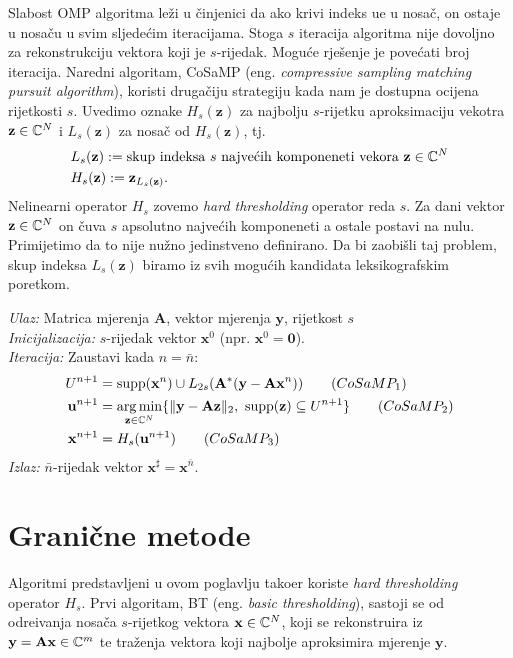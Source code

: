 \documentclass[a4paper,twoside,12pt]{memoir} %
\newcommand{\vect}[1]{\mathbf{#1}}
\renewcommand{\vec}{\vect}
\newcommand{\supp}{\text{\normalfont{supp}}}
\newcommand{\norm}[1]{\|{#1}\|}
\DeclareMathOperator*{\argmin}{arg\,min}
\newenvironment{alg}[1]
{
    \bigskip
    \begin{tcolorbox}[arc=0mm,boxrule=1.2pt,colframe=black,colback=white,detach title, before upper={\medskip\begin{center}\textbf{#1}\end{center}\hline\newline\medskip},frame hidden]
    \medskip
}
{
    \medskip
\end{tcolorbox}
    \bigskip
}
\begin{document}
\indent
Slabost OMP algoritma le\v{z}i u \v{c}injenici da ako krivi indeks u\dj e u nosa\v{c}, on ostaje u nosa\v{c}u u svim sljede\'cim iteracijama. Stoga $s$ iteracija algoritma nije dovoljno za rekonstrukciju vektora koji je $s$-rijedak. Mogu\'ce rje\v{s}enje je pove\'cati broj iteracija. Naredni algoritam, CoSaMP (eng. \textit{compressive sampling matching pursuit algorithm}), koristi druga\v{c}iju strategiju kada nam je dostupna ocijena rijetkosti $s$. Uvedimo oznake $H_s(\vec z)$ za najbolju $s$-rijetku aproksimaciju vekotra $\vec z \in \C^N$ i $L_s(\vec z)$ za nosa\v{c} od $H_s(\vec z)$, tj.
\begin{align}
    &L_s(\vec z) := \text{skup indeksa $s$ najve\'cih komponeneti vekora } \vec z \in \C^N \\
    &H_s(\vec z) := \vec z_{L_s(\vec z)}.
\end{align}
Nelinearni operator $H_s$ zovemo \textit{hard thresholding} operator reda $s$. Za dani vektor $\vec z \in \C^N$ on \v{c}uva $s$ apsolutno najve\'cih komponeneti a ostale postavi na nulu. Primijetimo da to nije nu\v{z}no jedinstveno definirano. Da bi zaobi\v{s}li taj problem, skup indeksa $L_s(\vec z)$ biramo iz svih mogu\'cih kandidata leksikografskim poretkom.

\begin{alg}{CoSaMP}
    \textit{Ulaz:} Matrica mjerenja $\vec A$, vektor mjerenja $\vec y$, rijetkost $s$ \\
    \textit{Inicijalizacija:} $s$-rijedak vektor $\vec x^0$ (npr. $\vec x^0 = \vec 0$).\\
    \textit{Iteracija:} Zaustavi kada $n = \bar{n}$:
        \begin{align*}
            U^{n+1} & = \supp(\vec x^n)\cup L_{2s}(\vec A^*(\vec y - \vec{Ax}^n))  \tag{$CoSaMP_1$}\label{cosamp_1}\\
            \vec u^{n+1} & = \argmin_{\vec z \in \C^N}\{\norm{\vec y - \vec{Az}}_2,\ \supp(\vec z) \subseteq U^{n+1}\}  \tag{$CoSaMP_2$}\label{cosamp_2}\\
            \vec x^{n+1} & = H_s(\vec u^{n+1})  \tag{$CoSaMP_3$}\label{cosamp_3}
        \end{align*}
        \textit{Izlaz:} $\bar{n}$-rijedak vektor $\vec x^{\sharp}=\vec{x}^{\bar{n}}$.
\end{alg}



\section[Grani\v{c}ne metode][Grani\v{c}ne metode]{Grani\v{c}ne metode}
Algoritmi predstavljeni u ovom poglavlju tako\dj er koriste \textit{hard thresholding} operator $H_s$. Prvi algoritam, BT (eng. \textit{basic thresholding}), sastoji se od odre\dj ivanja nosa\v{c}a $s$-rijetkog vektora $\vec x \in \C^N$, koji se rekonstruira iz $\vec y = \vec{Ax} \in \C^m$ te tra\v{z}enja vektora koji najbolje aproksimira mjerenje $\vec y$.
\end{document}
